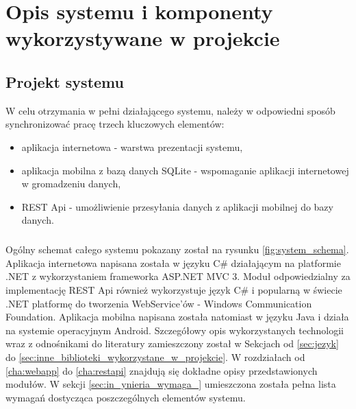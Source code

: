 \chapter{Opis systemu i komponenty wykorzystywane w projekcie}
\label{cha:projektsys}

\section{Projekt systemu} %
\label{sec:projket_systemu}
W celu otrzymania w pełni działającego systemu, należy w odpowiedni sposób synchronizować pracę trzech kluczowych elementów:
\begin{itemize}
	\item aplikacja internetowa - warstwa prezentacji systemu,
	\item aplikacja mobilna z bazą danych SQLite - wspomaganie aplikacji internetowej w gromadzeniu danych,
	\item REST Api - umożliwienie przesyłania danych z aplikacji mobilnej do bazy danych.
\end{itemize}

\paragraph{} %
\label{par:}
Ogólny schemat całego systemu pokazany został na rysunku \ref{fig:system_schema}. Aplikacja internetowa napisana została w języku C\# działającym na platformie .NET z wykorzystaniem frameworka ASP.NET MVC 3. Moduł odpowiedzialny za implementację REST Api również wykorzystuje język C\# i popularną w świecie .NET platformę do tworzenia WebService'ów - Windows Communication Foundation. Aplikacja mobilna napisana została natomiast w języku Java i działa na systemie operacyjnym Android. Szczegółowy opis wykorzystanych technologii wraz z odnośnikami do literatury zamieszczony został w Sekcjach od \ref{sec:jezyk} do \ref{sec:inne_biblioteki_wykorzystane_w_projekcie}. W rozdziałach od \ref{cha:webapp} do \ref{cha:restapi} znajdują się dokładne opisy przedstawionych modułów. W sekcji \ref{sec:in_ynieria_wymaga_} umieszczona została pełna lista wymagań dostycząca poszczególnych elementów systemu.


